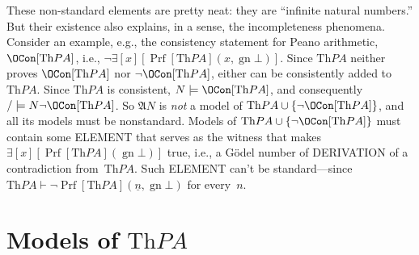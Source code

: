 \documentclass[10pt,a4paper]{article}
\newcommand*{\olup}[1]{\MakeUppercase{#1}}
\theoremstyle{plain}
\theoremstyle{definition}
\theoremstyle{remark}
\newcommand*{\olfileid}[3]{}
\newcommand*{\olchapter}[3]{}
\newcommand*{\olimport}[1]{}
\providecommand{\lexists}{\mathord{\exists}}
\providecommand{\lfalse}{\bot}
\providecommand{\Proves}{\mathrel{\vdash}}
\providecommand{\Struct}{\ensuremath{\mathfrak{A}}}
\providecommand{\Sat}[2]{\ensuremath{#1 \models #2}}
\providecommand{\Th}{\ensuremath{\mathrm{Th}}}
\providecommand{\num}[1]{\underline{#1}}
\providecommand{\gn}{\operatorname{gn}}
\providecommand{\OPrf}{\operatorname{Prf}}
\begin{document}
These non-standard elements are pretty neat: they are ``infinite
natural numbers.'' But their existence also explains, in a sense, the
incompleteness phenomena.  Consider an example, e.g., the consistency
statement for Peano arithmetic, $\OCon[\Th{PA}]$, i.e., $\lnot
\lexists[x][\OPrf[\Th{PA}](x, \gn{\lfalse})]$. Since $\Th{PA}$ neither
proves $\OCon[\Th{PA}]$ nor $\lnot \OCon[\Th{PA}]$, either can be
consistently added to $\Th{PA}$. Since $\Th{PA}$ is consistent,
$\Sat{N}{\OCon[\Th{PA}]}$, and consequently $\Sat/{N}{\lnot
  \OCon[\Th{PA}]}$.  So $\Struct{N}$ is \emph{not} a model of $\Th{PA}
\cup \{\lnot \OCon[\Th{PA}]\}$, and all its models must be
nonstandard. Models of $\Th{PA} \cup \{\lnot \OCon[\Th{PA}]\}$ must
contain some \olup{element} that serves as the witness that makes
$\lexists[x][\OPrf[\Th{PA}](\gn{\lfalse})]$ true, i.e., a G\"odel
number of \olup{derivation} of a contradiction from~$\Th{PA}$.  Such
\olup{element} can't be standard---since $\Th{PA} \Proves \lnot
\OPrf[\Th{PA}](\num{n}, \gn{\lfalse})$ for every~$n$.





\olchapter{mod}{mar}{Models of Arithmetic}

\olimport{introduction}

\olimport{standard-models}

\olimport{non-standard-models}

\olimport{models-of-q}

\olimport{models-of-pa}

\olimport{computable-models}

\OLEndChapterHook





\olfileid{mod}{mar}{mpa}
\section{Models of $\Th{PA}$}
\end{document}

